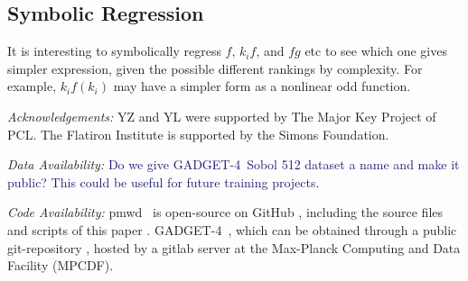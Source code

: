 \documentclass[modern, trackchanges, dvipsnames]{aastex631}
\newcommand{\pmwd}{{\usefont{T1}{nova}{m}{sl}pmwd}}
\newcommand{\GADGET}{{{\fontsize{10pt}{12pt}\selectfont GADGET}-4}}
\newcommand{\YL}[1]{\textcolor{Bittersweet}{#1}}
\newcommand{\YZ}[1]{\textcolor{MidnightBlue}{#1}}
\begin{document}
\vspace{1em}
\subsection{Symbolic Regression}


\YL{It is interesting to symbolically regress $f$, $k_i f$, and $f g$
etc to see which one gives simpler expression, given the possible
different rankings by complexity.
For example, $k_i f(k_i)$ may have a simpler form as a nonlinear odd
function.}


\vspace{1em}
\textit{\large Acknowledgements:}
YZ and YL were supported by The Major Key Project of PCL.
The Flatiron Institute is supported by the Simons Foundation.


\vspace{1em}
\textit{\large Data Availability:}
\YZ{Do we give \GADGET\ Sobol 512 dataset a name and make it public? This could
be useful for future training projects.}


\vspace{1em}
\textit{\large Code Availability:}
\pmwd\ \citep{Li2022b} is open-source on GitHub
\href{https://github.com/eelregit/pmwd}{\faGithub}, including the source files
and scripts of this paper
\href{https://github.com/eelregit/pmwd/tree/master/docs/papers/sto}{\faFile}.
\GADGET\ \citep{GADGET-4}, which can be obtained through a public git-repository
\href{http://gitlab.mpcdf.mpg.de/vrs/gadget4}{\faGitlab}, hosted by a gitlab
server at the Max-Planck Computing and Data Facility (MPCDF).







\appendix


\end{document}

